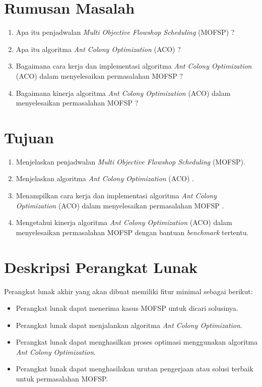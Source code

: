 \documentclass[a4paper,twoside]{article}
\begin{document}
\section{Rumusan Masalah}

\begin{enumerate}[label=(\alph*)]
	\item Apa itu penjadwalan {\it Multi Objective Flowshop Scheduling} (MOFSP) ?
	\item Apa itu algoritma {\it Ant Colony Optimization} (ACO) ?
	\item Bagaimana cara kerja dan implementasi algoritma {\it Ant Colony Optimization} (ACO) dalam menyelesaikan permasalahan MOFSP ?
	\item Bagaimana kinerja algoritma {\it Ant Colony Optimization} (ACO) dalam menyelesaikan permasalahan MOFSP ?

\end{enumerate}

\section{Tujuan}

\begin{enumerate}[label=(\alph*)]
	\item Menjelaskan penjadwalan {\it Multi Objective Flowshop Scheduling} (MOFSP).
	\item Menjelaskan algoritma {\it Ant Colony Optimization} (ACO) .
	\item Menampilkan  cara kerja dan implementasi algoritma {\it Ant Colony Optimization} (ACO) dalam menyelesaikan permasalahan MOFSP .
	\item Mengetahui kinerja algoritma {\it Ant Colony Optimization} (ACO) dalam menyelesaikan permasalahan MOFSP dengan bantuan {\it benchmark} tertentu.
\end{enumerate}

\section{Deskripsi Perangkat Lunak}

Perangkat lunak akhir yang akan dibuat memiliki fitur minimal sebagai berikut:
\begin{itemize}
	\item Perangkat lunak dapat menerima kasus MOFSP untuk dicari solusinya.
	\item Perangkat lunak dapat menjalankan algoritma {\it Ant Colony Optimization}.
	\item Perangkat lunak dapat menghasilkan proses optimasi menggunakan algoritma {\it Ant Colony Optimization}.
	\item Perangkat lunak dapat menghasilakan urutan pengerjaan atau solusi terbaik untuk permasalahan MOFSP.
	
\end{itemize}
\end{document}
